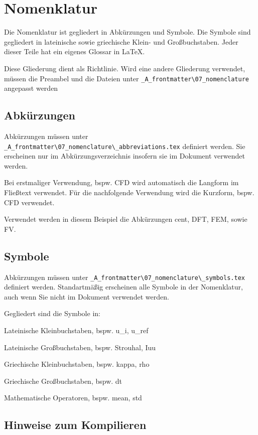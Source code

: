\chapter{Nomenklatur}

Die Nomenklatur ist gegliedert in Abkürzungen und Symbole. Die Symbole sind gegliedert in lateinische sowie griechische Klein- und Großbuchstaben. Jeder dieser Teile hat ein eigenes Glossar in LaTeX. 

Diese Gliederung dient als Richtlinie. Wird eine andere Gliederung verwendet, müssen die Preambel und die Dateien unter \lstinline[basicstyle=\ttfamily]|_A_frontmatter\07_nomenclature| angepasst werden

\section{Abkürzungen}
Abkürzungen müssen unter \lstinline[basicstyle=\ttfamily]|_A_frontmatter\07_nomenclature\_abbreviations.tex| definiert werden. Sie erscheinen nur im Abkürzungsverzeichnis insofern sie im Dokument verwendet werden. 

Bei erstmaliger Verwendung, bspw. \gls{CFD} wird automatisch die Langform im Fließtext verwendet. Für die nachfolgende Verwendung wird die Kurzform, bspw. \gls{CFD} verwendet.

Verwendet werden in diesem Beispiel die Abkürzungen \gls{cent}, \gls{DFT}, \gls{FEM},  sowie \gls{FV}.

\section{Symbole}

Abkürzungen müssen unter \lstinline[basicstyle=\ttfamily]|_A_frontmatter\07_nomenclature\_symbols.tex| definiert werden. Standartmäßig erscheinen alle Symbole in der Nomenklatur, auch wenn Sie nicht im Dokument verwendet werden. 

Gegliedert sind die Symbole in:

Lateinische Kleinbuchstaben, bspw. \gls{u_i}, \gls{u_ref}

Lateinische Großbuchstaben, bspw. \gls{Strouhal}, \gls{Iuu}

Griechische Kleinbuchstaben, bspw. \gls{kappa}, \gls{rho}

Griechische Großbuchstaben, bspw. \gls{dt}

Mathematische Operatoren, bspw. \gls{mean}, \gls{std} 

\newpage

\section{Hinweise zum Kompilieren}

